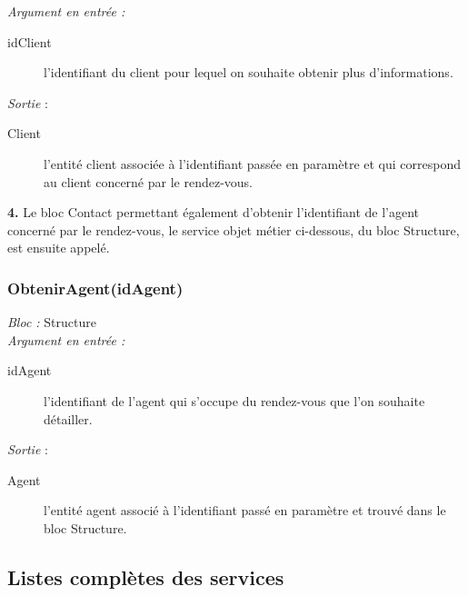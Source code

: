 \noindent \textit{Argument en entrée :}
\begin{description}
\item[idClient] l'identifiant du client pour lequel on souhaite obtenir plus d'informations. \\
\end{description}


\noindent \textit{Sortie} :
\begin{description}
\item[Client] l'entité client associée à l'identifiant passée en paramètre et qui correspond au client concerné par le rendez-vous.\\
\end{description}

\begin{shaded}
\textbf{4.} Le bloc Contact permettant également d'obtenir l'identifiant de l'agent concerné par le rendez-vous, le service objet métier ci-dessous, du bloc Structure, est ensuite appelé. 
\end{shaded}


\subsubsection{ObtenirAgent(idAgent)}
\noindent \textit{Bloc : } Structure \\

\noindent \textit{Argument en entrée :}
\begin{description}
\item[idAgent] l'identifiant de l'agent qui s'occupe du rendez-vous que l'on souhaite détailler. \\
\end{description}

\noindent \textit{Sortie} :
\begin{description}
\item[Agent] l'entité agent associé à l'identifiant passé en paramètre et trouvé dans le bloc Structure. \\
\end{description} 


\restoregeometry
\subsection{Listes complètes des services}

